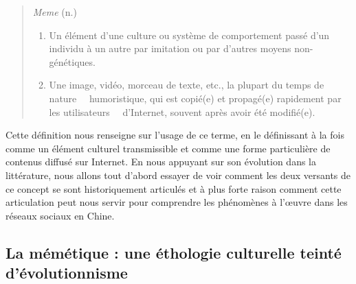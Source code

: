 \begin{quote}
    \textit{Meme} (n.)

    \begin{enumerate}
        \item Un élément d{\textquoteright}une culture ou système de comportement passé d{\textquoteright}un individu à un autre par imitation ou par d{\textquoteright}autres moyens non-génétiques.
        \item Une image, vidéo, morceau de texte, etc., la plupart du temps de nature \ \ humoristique, qui est copié(e) et propagé(e) rapidement par les utilisateurs \ \ d{\textquoteright}Internet, souvent après avoir été modifié(e).
    \end{enumerate}

\end{quote}

 Cette définition nous renseigne sur l{\textquoteright}usage de ce terme, en le définissant à la fois comme un élément culturel transmissible et comme une forme particulière de contenus diffusé sur Internet. En nous appuyant sur son évolution dans la littérature, nous allons tout d{\textquoteright}abord essayer de voir comment les deux versants de ce concept se sont historiquement articulés et à plus forte raison comment cette articulation peut nous servir pour comprendre les phénomènes à l{\textquoteright}{\oe}uvre dans les réseaux sociaux en Chine. 

\subsection[La mémétique : une éthologie culturelle teinté d{\textquoteright}évolutionnisme]{La mémétique : une éthologie culturelle teinté d{\textquoteright}évolutionnisme}


